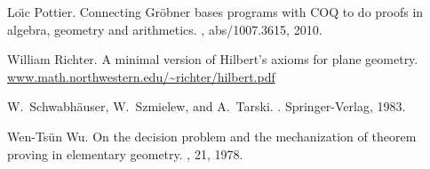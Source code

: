 \begin{thebibliography}{10}
Lo\"{\i}c Pottier.
\newblock Connecting Gr{\"o}bner bases programs with COQ to do proofs in
  algebra, geometry and arithmetics.
, abs/1007.3615, 2010.

William Richter.
\newblock A minimal version of Hilbert's axioms for plane geometry.
\newblock \url{www.math.northwestern.edu/~richter/hilbert.pdf}

W.~Schwabhäuser, W.~Szmielew, and A.~Tarski.
.
\newblock Springer-Verlag, 1983.

Wen-Ts\"un Wu.
\newblock On the decision problem and the mechanization of theorem proving in
  elementary geometry.
, 21, 1978.
\end{thebibliography}



